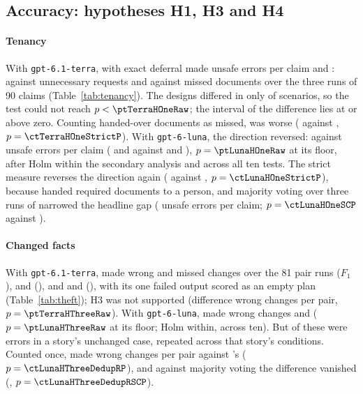 \subsection{Accuracy: hypotheses H1, H3 and H4}
\label{sec:results-accuracy}

\paragraph{Tenancy}
With \texttt{gpt-6.1-terra}, \casepath with exact deferral made \ctTerraHOneA{} unsafe errors per claim and  \ctTerraHOneB: \tenTerraCPxFP{} against \tenTerraBoneFP{} unnecessary requests and \tenTerraCPxMissN{} against \tenTerraBoneMissN{} missed documents over the three runs of 90 claims (Table~\ref{tab:tenancy}). The designs differed in only \ctTerraHOneNonzero{} of \ctTerraHOneClusters{} scenarios, so the test could not reach $p<\ptTerraHOneRaw$; the interval of the difference lies at or above zero. Counting handed-over documents as missed, \casepath was worse (\ctTerraHOneStrictA{} against \ctTerraHOneStrictB, $p=\ctTerraHOneStrictP$). With \texttt{gpt-6-luna}, the direction reversed: \ctLunaHOneA{} against \ctLunaHOneB{} unsafe errors per claim (\tenLunaCPxFP{} and \tenLunaCPxMissN{} against \tenLunaBoneFP{} and \tenLunaBoneMissN), $p=\ptLunaHOneRaw$ at its floor, \ptLunaHOne{} after Holm within the secondary analysis and \ptLunaHOneHolmAll{} across all ten tests. The strict measure reverses the direction again (\ctLunaHOneStrictA{} against \ctLunaHOneStrictB, $p=\ctLunaHOneStrictP$), because \casepath handed \tenLunaCPxHandedN{} required documents to a person, and majority voting over three runs of  narrowed the headline gap (\ctLunaHOneSCB{} unsafe errors per claim; $p=\ctLunaHOneSCP$ against \casepath).

\paragraph{Changed facts}
With \texttt{gpt-6.1-terra},  made \thTerraRWrong{} wrong and \thTerraRMissed{} missed changes over the 81 pair runs ($F_1$ \thTerraRFone), \casepath \thTerraCPWrong{} and \thTerraCPMissed{} (\thTerraCPFone), and  \thTerraDWrong{} and \thTerraDMissed{} (\thTerraDFone), with its one failed output scored as an empty plan (Table~\ref{tab:theft}); H3 was not supported (difference \ctTerraHThreeRDiff{} wrong changes per pair, $p=\ptTerraHThreeRaw$). With \texttt{gpt-6-luna}, \casepath made \thLunaCPWrong{} wrong changes and  \thLunaRWrong{} ($p=\ptLunaHThreeRaw$ at its floor; Holm \ptLunaHThree{} within, \ptLunaHThreeHolmAll{} across ten). But \thLunaRWrongInShared{} of these \thLunaRWrong{} were errors in a story's unchanged case, repeated across that story's conditions. Counted once,  made \thLunaRDedupWrongPP{} wrong changes per pair against \casepath's \thLunaCPDedupWrongPP{} ($p=\ctLunaHThreeDedupRP$), and against majority voting the difference vanished (\ctLunaHThreeDedupRSCDiff, $p=\ctLunaHThreeDedupRSCP$).

